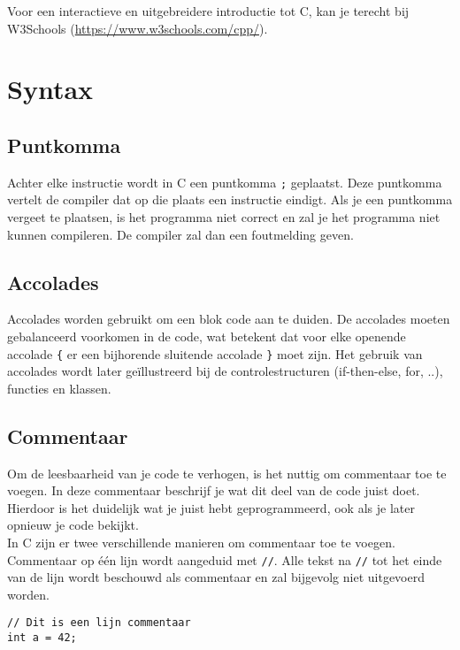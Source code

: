 \documentclass[11pt,fleqn]{book} %
\def\Cpp{{C\nolinebreak[4]\hspace{-.05em}\raisebox{.4ex}{\tiny\bf ++}}}
\begin{document}
\noindent Voor een interactieve en uitgebreidere introductie tot \Cpp, kan je terecht bij W3Schools (\url{https://www.w3schools.com/cpp/}).

\nocite{w3schools:cpp, tutorialspoint:cpp}

\section{Syntax}
\subsection{Puntkomma}
Achter elke instructie wordt in \Cpp{} een puntkomma \texttt{;} geplaatst. Deze puntkomma vertelt de compiler dat op die plaats een instructie eindigt. Als je een puntkomma vergeet te plaatsen, is het programma niet correct en zal je het programma niet kunnen compileren. De compiler zal dan een foutmelding geven.

\subsection{Accolades}
Accolades \texttt{{}} worden gebruikt om een blok code aan te duiden. De accolades moeten gebalanceerd voorkomen in de code, wat betekent dat voor elke openende accolade \texttt{\{} er een bijhorende sluitende accolade \texttt{\}} moet zijn. Het gebruik van accolades wordt later geïllustreerd bij de controlestructuren (if-then-else, for, ..), functies en klassen.

\subsection{Commentaar}
Om de leesbaarheid van je code te verhogen, is het nuttig om commentaar toe te voegen. In deze commentaar beschrijf je wat dit deel van de code juist doet. Hierdoor is het duidelijk wat je juist hebt geprogrammeerd, ook als je later opnieuw je code bekijkt.\\

\noindent In \Cpp{} zijn er twee verschillende manieren om commentaar toe te voegen.\\
Commentaar op één lijn wordt aangeduid met \texttt{//}. Alle tekst na \texttt{//} tot het einde van de lijn wordt beschouwd als commentaar en zal bijgevolg niet uitgevoerd worden. 

\begin{example}[Commentaarlijn]
	\phantom{ }
	\begin{verbatim}
// Dit is een lijn commentaar
int a = 42;
	\end{verbatim}
\end{example}
\end{document}
